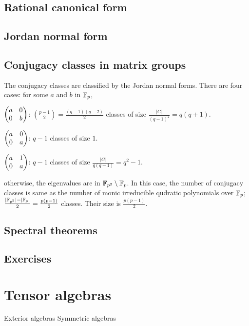 \documentclass{../note}
\begin{document}
\section{Rational canonical form}
\begin{prb}
\end{prb}
\begin{prb}
\end{prb}
\section{Jordan normal form}


\section{Conjugacy classes in matrix groups}

\begin{prb}
The conjugacy classes are classified by the Jordan normal forms.
There are four cases: for some $a$ and $b$ in $\mathbb{F}_p$,
\begin{parts}
\item $\begin{pmatrix}a&0\\0&b\end{pmatrix}$: $\binom{p-1}2=\frac{(q-1)(q-2)}2$ classes of size $\frac{|G|}{(q-1)^2}=q(q+1)$.
\item $\begin{pmatrix}a&0\\0&a\end{pmatrix}$: $q-1$ classes of size $1$.
\item $\begin{pmatrix}a&1\\0&a\end{pmatrix}$: $q-1$ classes of size $\frac{|G|}{q(q-1)}=q^2-1$.
\item otherwise, the eigenvalues are in $\mathbb{F}_{p^2}\setminus\mathbb{F}_p$.
In this case, the number of conjugacy classes is same as the number of monic irreducible qudratic polynomials over $\mathbb{F}_p$; $\frac{|\mathbb{F}_{p^2}|-|\mathbb{F}_p|}2=\frac{p(p-1)}2$ classes.
Their size is $\frac{p(p-1)}2$.
\end{parts}
\end{prb}

\section{Spectral theorems}



\section*{Exercises}




\chapter{Tensor algebras}
Exterior algebras
Symmetric algebras
\end{document}
